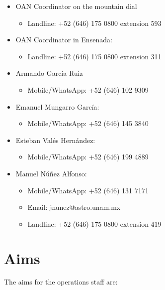 \documentclass{article}
\begin{document}
\begin{itemize}
\item
OAN Coordinator on the mountain dial
\begin{itemize}
\item Landline: +52 (646) 175 0800 extension 593
\end{itemize}
\item
OAN Coordinator in Ensenada:
\begin{itemize}
\item Landline: +52 (646) 175 0800 extension 311
\end{itemize}
\item
Armando García Ruiz
\begin{itemize}
\item Mobile/WhatsApp: +52 (646) 102 9309
\end{itemize}
\item
Emanuel Mungarro García:
\begin{itemize}
\item Mobile/WhatsApp: +52 (646) 145 3840
\end{itemize}
\item
Esteban Valés Hernández:
\begin{itemize}
\item Mobile/WhatsApp:  +52 (646) 199 4889
\end{itemize}
\item Manuel Núñez Alfonso: 
\begin{itemize}
\item Mobile/WhatsApp: +52 (646) 131 7171 
\item Email: jnunez@astro.unam.mx 
\item Landline: +52 (646) 175 0800 extension 419
\end{itemize}
\end{itemize}

\section{Aims}

The aims for the operations staff are:
\end{document}
